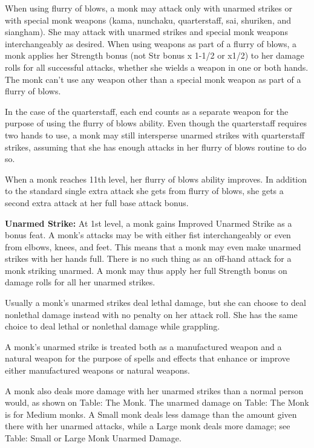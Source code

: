 \documentclass{article}
\begin{document}
When using flurry of blows, a monk may attack only with unarmed strikes or with 
special monk weapons (kama, nunchaku, quarterstaff, sai, shuriken, and siangham). 
She may attack with unarmed strikes and special monk weapons interchangeably as 
desired. When using weapons as part of a flurry of blows, a monk applies her Strength 
bonus (not Str bonus x $ $1-1/2 or x$ $1/2) to her damage rolls for all successful 
attacks, whether she wields a weapon in one or both hands. The monk can't use any 
weapon other than a special monk weapon as part of a flurry of blows.

In the case of the quarterstaff, each end counts as a separate weapon for the purpose 
of using the flurry of blows ability. Even though the quarterstaff requires two 
hands to use, a monk may still intersperse unarmed strikes with quarterstaff strikes, 
assuming that she has enough attacks in her flurry of blows routine to do so. 

When a monk reaches 11th level, her flurry of blows ability improves. In addition 
to the standard single extra attack she gets from flurry of blows, she gets a second 
extra attack at her full base attack bonus.

\textbf{Unarmed Strike:} At 1st level, a monk gains Improved Unarmed Strike as 
a bonus feat. A monk's attacks may be with either fist interchangeably or even 
from elbows, knees, and feet. This means that a monk may even make unarmed strikes 
with her hands full. There is no such thing as an off-hand attack for a monk striking 
unarmed. A monk may thus apply her full Strength bonus on damage rolls for all 
her unarmed strikes.

Usually a monk's unarmed strikes deal lethal damage, but she can choose to deal 
nonlethal damage instead with no penalty on her attack roll. She has the same choice 
to deal lethal or nonlethal damage while grappling.

A monk's unarmed strike is treated both as a manufactured weapon and a natural 
weapon for the purpose of spells and effects that enhance or improve either manufactured 
weapons or natural weapons.

A monk also deals more damage with her unarmed strikes than a normal person would, 
as shown on Table: The Monk. The unarmed damage on Table: The Monk is for Medium 
monks. A Small monk deals less damage than the amount given there with her unarmed 
attacks, while a Large monk deals more damage; see Table: Small or Large Monk Unarmed 
Damage.
\end{document}
